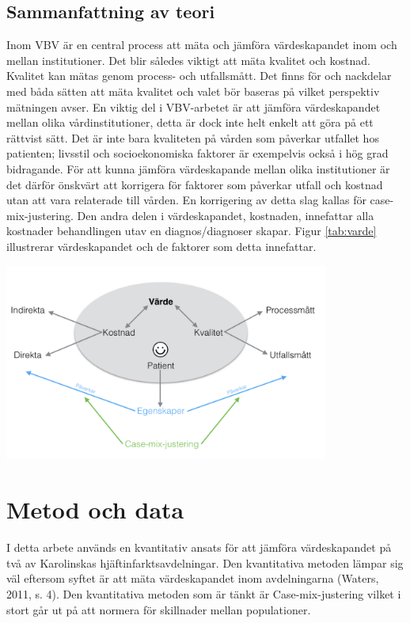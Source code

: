 \subsection{Sammanfattning av teori}

Inom VBV är en central process att mäta och jämföra värdeskapandet inom och mellan institutioner. Det blir således viktigt att mäta kvalitet och kostnad. Kvalitet kan mätas genom process- och utfallsmått. Det finns för och nackdelar med båda sätten att mäta kvalitet och valet bör baseras på vilket perspektiv mätningen avser. En viktig del i VBV-arbetet är att jämföra värdeskapandet mellan olika vårdinstitutioner, detta är dock inte helt enkelt att göra på ett rättvist sätt. Det är inte bara kvaliteten på vården som påverkar utfallet hos patienten; livsstil och socioekonomiska faktorer är exempelvis också i hög grad bidragande. För att kunna jämföra värdeskapande mellan olika institutioner är det därför önskvärt att korrigera för faktorer som påverkar utfall och kostnad utan att vara relaterade till vården. En korrigering av detta slag kallas för case-mix-justering. Den andra delen i värdeskapandet, kostnaden, innefattar alla kostnader behandlingen utav en diagnos/diagnoser skapar. Figur \ref{tab:varde} illustrerar värdeskapandet och de faktorer som detta innefattar.

\noindent\begin{minipage}{\textwidth}
\centering
\includegraphics[width=0.8\textwidth]{varde}
\label{tab:varde}            
\end{minipage}

\section{Metod och data}

I detta arbete används en kvantitativ ansats för att jämföra värdeskapandet på två av Karolinskas hjäftinfarktsavdelningar. Den kvantitativa metoden lämpar sig väl eftersom syftet är att mäta värdeskapandet inom avdelningarna (Waters, 2011, s. 4). Den kvantitativa metoden som är tänkt är Case-mix-justering vilket i stort går ut på att normera för skillnader mellan populationer. 

